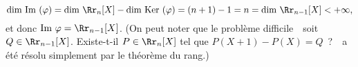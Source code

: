 {\begin{enumerate}
{$$\mbox{dim }\mbox{Im }(\varphi)=\mbox{dim }\Rr_n[X]-\mbox{dim }\mbox{Ker }(\varphi)=(n+1)-1=n=\mbox{dim }\Rr_{n-1}[X]
<+\infty,$$
et donc $\mbox{Im }\varphi=\Rr_{n-1}[X]$. (On peut noter que le problème difficile~\og~soit $Q\in\Rr_{n-1}[X]$.
Existe-t-il $P\in\Rr_n[X]$ tel que $P(X+1)-P(X)=Q$~?~\fg~a été résolu simplement par le théorème du rang.)}
\end{enumerate}
}